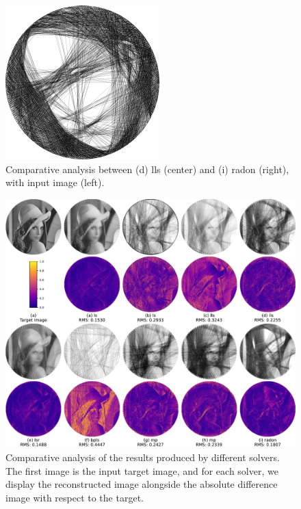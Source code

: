 \begin{figure}[H]
\begin{minipage}{0.2\linewidth}
    \end{minipage}
    \begin{minipage}{0.2\linewidth}
        \centering
        \includegraphics[width=\linewidth]{images/lls vs radon/radon.png}
    \end{minipage}
    \caption{Comparative analysis between (d) lls (center) and (i) radon (right), with input image (left).}
    \label{fig:lls_vs_radon}
\end{figure}

\begin{figure}[H]
    \centering
    \includegraphics[width=0.9\linewidth]{images/benchmarks/diff_images.pdf}
    \caption{Comparative analysis of the results produced by different solvers. The first image is the input target image, and for each solver, we display the reconstructed image alongside the absolute difference image with respect to the target.}
    \label{fig:diff_images}
\end{figure}

